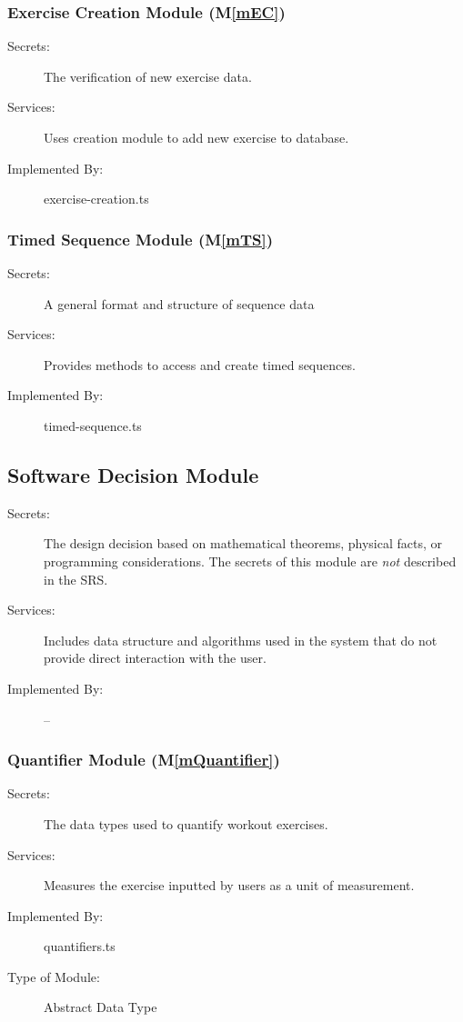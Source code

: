 \documentclass[12pt, titlepage]{article}
\newcommand{\mref}[1]{M\ref{#1}}
\begin{document}
\subsubsection{Exercise Creation Module (\mref{mEC})}

\begin{description}
\item[Secrets:] The verification of new exercise data.
\item[Services:] Uses creation module to add new exercise to database.
\item[Implemented By:] exercise-creation.ts
\end{description}

\subsubsection{Timed Sequence Module (\mref{mTS})}

\begin{description}
\item[Secrets:] A general format and structure of sequence data
\item[Services:] Provides methods to access and create timed sequences.
\item[Implemented By:] timed-sequence.ts
\end{description}

\subsection{Software Decision Module}

\begin{description}
\item[Secrets:] The design decision based on mathematical theorems, physical
  facts, or programming considerations. The secrets of this module are
  \emph{not} described in the SRS.
\item[Services:] Includes data structure and algorithms used in the system that
  do not provide direct interaction with the user. 
\item[Implemented By:] --
\end{description}

\subsubsection{Quantifier Module (\mref{mQuantifier})}
\begin{description}
\item[Secrets:] The data types used to quantify workout exercises.
\item[Services:] Measures the exercise inputted by users as a unit of measurement.
\item[Implemented By:] quantifiers.ts
\item[Type of Module:] Abstract Data Type
\end{description}
\end{document}
